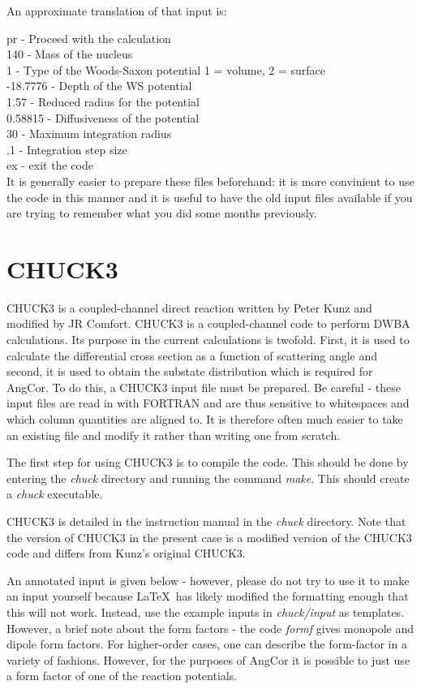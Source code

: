 \documentclass[a4paper,10pt]{article}
\begin{document}
An approximate translation of that input is:
\newline

\noindent pr - Proceed with the calculation\\
140 - Mass of the nucleus\\
1 - Type of the Woods-Saxon potential 1 = volume, 2 = surface\\
-18.7776 - Depth of the WS potential\\
1.57 - Reduced radius for the potential\\
0.58815 - Diffusiveness of the potential\\
30 - Maximum integration radius\\
.1 - Integration step size\\
ex - exit the code\\

It is generally easier to prepare these files beforehand: it is more convinient to use the code in this manner and it is useful to have the old input files available if you are trying to remember what you did some months previously.


\section{CHUCK3}

CHUCK3 is a coupled-channel direct reaction written by Peter Kunz and modified by JR Comfort. CHUCK3 is a coupled-channel code to perform DWBA calculations. Its purpose in the current calculations is twofold. First, it is used to calculate the differential cross section as a function of scattering angle and second, it is used to obtain the substate distribution which is required for AngCor. To do this, a CHUCK3 input file must be prepared. Be careful - these input files are read in with FORTRAN and are thus sensitive to whitespaces and which column quantities are aligned to. It is therefore often much easier to take an existing file and modify it rather than writing one from scratch.

The first step for using CHUCK3 is to compile the code. This should be done by entering the {\it chuck} directory and running the command {\it make}. This should create a {\it chuck} executable.

CHUCK3 is detailed in the instruction manual in the {\it chuck} directory. Note that the version of CHUCK3 in the present case is a modified version of the CHUCK3 code and differs from Kunz's original CHUCK3.

An annotated input is given below - however, please do not try to use it to make an input yourself because \LaTeX\ has likely modified the formatting enough that this will not work. Instead, use the example inputs in {\it chuck/input} as templates. However, a brief note about the form factors - the code {\it formf} gives monopole and dipole form factors. For higher-order cases, one can describe the form-factor in a variety of fashions. However, for the purposes of AngCor it is possible to just use a form factor of one of the reaction potentials.
\end{document}

